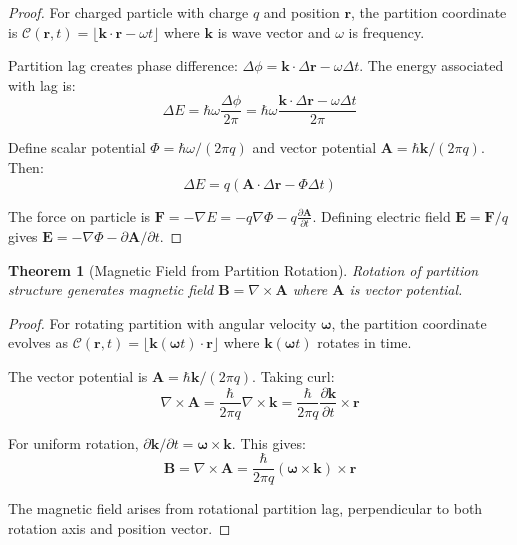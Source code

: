 \documentclass[twocolumn,10pt]{article}
\newtheorem{theorem}{Theorem}[section]
\begin{document}
\begin{proof}
For charged particle with charge $q$ and position $\mathbf{r}$, the partition coordinate is $\mathcal{C}(\mathbf{r}, t) = \lfloor \mathbf{k} \cdot \mathbf{r} - \omega t \rfloor$ where $\mathbf{k}$ is wave vector and $\omega$ is frequency.

Partition lag creates phase difference: $\Delta\phi = \mathbf{k} \cdot \Delta\mathbf{r} - \omega \Delta t$. The energy associated with lag is:
\begin{equation}
\Delta E = \hbar\omega \frac{\Delta\phi}{2\pi} = \hbar\omega \frac{\mathbf{k} \cdot \Delta\mathbf{r} - \omega \Delta t}{2\pi}
\end{equation}

Define scalar potential $\Phi = \hbar\omega/(2\pi q)$ and vector potential $\mathbf{A} = \hbar\mathbf{k}/(2\pi q)$. Then:
\begin{equation}
\Delta E = q(\mathbf{A} \cdot \Delta\mathbf{r} - \Phi \Delta t)
\end{equation}

The force on particle is $\mathbf{F} = -\nabla E = -q\nabla\Phi - q\frac{\partial \mathbf{A}}{\partial t}$. Defining electric field $\mathbf{E} = \mathbf{F}/q$ gives $\mathbf{E} = -\nabla\Phi - \partial \mathbf{A}/\partial t$.
\end{proof}

\begin{theorem}[Magnetic Field from Partition Rotation]
\label{thm:magnetic_field}
Rotation of partition structure generates magnetic field $\mathbf{B} = \nabla \times \mathbf{A}$ where $\mathbf{A}$ is vector potential.
\end{theorem}

\begin{proof}
For rotating partition with angular velocity $\boldsymbol{\omega}$, the partition coordinate evolves as $\mathcal{C}(\mathbf{r}, t) = \lfloor \mathbf{k}(\boldsymbol{\omega} t) \cdot \mathbf{r} \rfloor$ where $\mathbf{k}(\boldsymbol{\omega} t)$ rotates in time.

The vector potential is $\mathbf{A} = \hbar \mathbf{k}/(2\pi q)$. Taking curl:
\begin{equation}
\nabla \times \mathbf{A} = \frac{\hbar}{2\pi q} \nabla \times \mathbf{k} = \frac{\hbar}{2\pi q} \frac{\partial \mathbf{k}}{\partial t} \times \mathbf{r}
\end{equation}

For uniform rotation, $\partial \mathbf{k}/\partial t = \boldsymbol{\omega} \times \mathbf{k}$. This gives:
\begin{equation}
\mathbf{B} = \nabla \times \mathbf{A} = \frac{\hbar}{2\pi q} (\boldsymbol{\omega} \times \mathbf{k}) \times \mathbf{r}
\end{equation}

The magnetic field arises from rotational partition lag, perpendicular to both rotation axis and position vector.
\end{proof}
\end{document}

